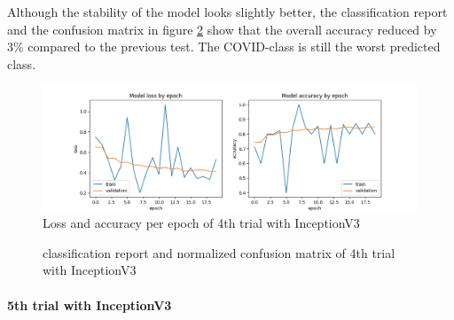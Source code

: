 \documentclass{article}
\begin{document}
Although the stability of the model looks slightly better, the classification report and the confusion matrix in figure \ref{fig:inceptionv3_07_results} show that the overall accuracy reduced by 3\% compared to the previous test. The COVID-class is still the worst predicted class. \\ 

\begin{figure}%
    \centering
    \includegraphics[width=1.0\linewidth]{inceptionv3_07_loss_accuracy.png}
    \caption{Loss and accuracy per epoch of 4th trial with InceptionV3}
    \label{fig:inceptionv3_07_loss_accuracy}
\end{figure}

\begin{figure}%
  \centering
  \qquad
  \caption{classification report and normalized confusion matrix of 4th trial with InceptionV3}
  \label{fig:inceptionv3_07_results}
\end{figure}

\paragraph{5th trial with InceptionV3}\mbox{}\\
\end{document}
